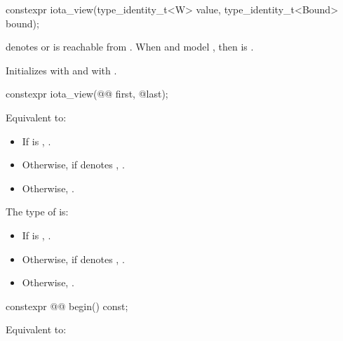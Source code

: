 %
\begin{itemdecl}
constexpr iota_view(type_identity_t<W> value, type_identity_t<Bound> bound);
\end{itemdecl}

\begin{itemdescr}
\pnum
\expects
{} denotes  or
 is reachable from .
When  and  model ,
then  is .

\pnum
\effects
Initializes  with  and
 with .
\end{itemdescr}

%
\begin{itemdecl}
constexpr iota_view(@@ first, @\seebelow@ last);
\end{itemdecl}

\begin{itemdescr}
\pnum
\effects
Equivalent to:
\begin{itemize}
\item
If  is ,
.
\item
Otherwise, if  denotes ,
.
\item
Otherwise, .
\end{itemize}

\pnum
\remarks
The type of  is:
\begin{itemize}
\item
If  is , .
\item
Otherwise, if  denotes ,
.
\item
Otherwise, .
\end{itemize}
\end{itemdescr}

%
\begin{itemdecl}
constexpr @@ begin() const;
\end{itemdecl}

\begin{itemdescr}
\pnum
\effects
Equivalent to: 
\end{itemdescr}

